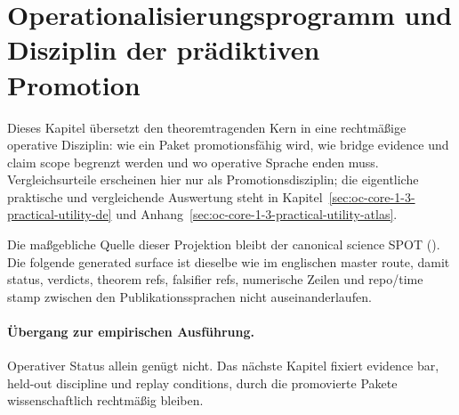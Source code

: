 \section{Operationalisierungsprogramm und Disziplin der prädiktiven Promotion}
\label{sec:oc-core-1-3-operationalization-program-de}

Dieses Kapitel übersetzt den theoremtragenden Kern in eine rechtmäßige
operative Disziplin: wie ein Paket promotionsfähig wird, wie bridge evidence
und claim scope begrenzt werden und wo operative Sprache enden muss.
Vergleichsurteile erscheinen hier nur als Promotionsdisziplin; die eigentliche
praktische und vergleichende Auswertung steht in
Kapitel~\ref{sec:oc-core-1-3-practical-utility-de} und
Anhang~\ref{sec:oc-core-1-3-practical-utility-atlas}.

Die maßgebliche Quelle dieser Projektion bleibt der canonical science SPOT
(). Die folgende generated surface ist
dieselbe wie im englischen master route, damit status, verdicts, theorem refs,
falsifier refs, numerische Zeilen und repo/time stamp zwischen den
Publikationssprachen nicht auseinanderlaufen.

\begingroup
\small

\endgroup

\paragraph{Übergang zur empirischen Ausführung.}
Operativer Status allein genügt nicht. Das nächste Kapitel fixiert evidence
bar, held-out discipline und replay conditions, durch die promovierte Pakete
wissenschaftlich rechtmäßig bleiben.

